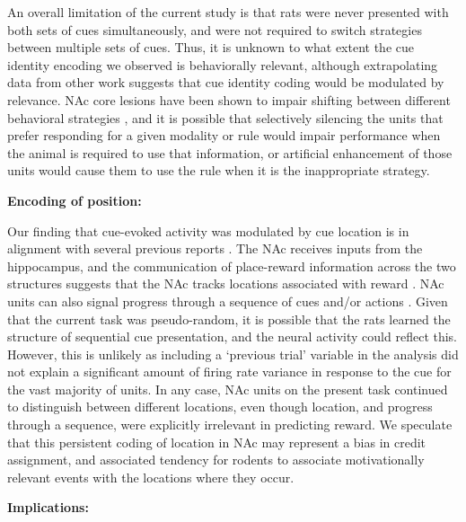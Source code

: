 \documentclass[11pt]{article}
\let\cite=\citep
\begin{document}
An overall limitation of the current study is that rats were never
presented with both sets of cues simultaneously, and were not required
to switch strategies between multiple sets of cues. Thus, it is
unknown to what extent the cue identity encoding we observed is
behaviorally relevant, although extrapolating data from other work
\cite{Sleezer2016} suggests that cue identity coding would be
modulated by relevance. NAc core lesions have been shown to impair
shifting between different behavioral strategies \cite{Floresco2006a},
and it is possible that selectively silencing the units that prefer
responding for a given modality or rule would impair performance when
the animal is required to use that information, or artificial
enhancement of those units would cause them to use the rule when it is
the inappropriate strategy.

{\bf Encoding of position:}

Our finding that cue-evoked activity was modulated by cue location is
in alignment with several previous reports
\cite{Lavoie1994,Wiener2003,Mulder2005,Strait2016}. The NAc receives
inputs from the hippocampus, and the communication of place-reward
information across the two structures suggests that the NAc tracks
locations associated with reward
\cite{Tabuchi2000,Pennartz2004,Lansink2008,Lansink2009,VanderMeer2011,Lansink2016,Sjulson2017}. NAc
units can also signal progress through a sequence of cues and/or
actions
\cite{Shidara1998,Mulder2004,Khamassi2008,Berke2009,Lansink2012,Atallah2014}. Given
that the current task was pseudo-random, it is possible that the rats
learned the structure of sequential cue presentation, and the neural
activity could reflect this. However, this is unlikely as including a
‘previous trial’ variable in the analysis did not explain a
significant amount of firing rate variance in response to the cue for
the vast majority of units. In any case, NAc units on the present
task continued to distinguish between different locations, even though
location, and progress through a sequence, were explicitly irrelevant
in predicting reward. We speculate that this persistent coding of
location in NAc may represent a bias in credit assignment, and
associated tendency for rodents to associate motivationally relevant
events with the locations where they occur.

{\bf Implications:}
\end{document}
